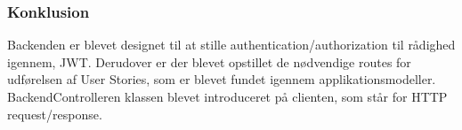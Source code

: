 \subsubsection{Konklusion}

Backenden er blevet designet til at stille authentication/authorization til rådighed igennem, JWT. Derudover er der blevet opstillet de nødvendige routes for udførelsen af User Stories, som er blevet fundet igennem applikationsmodeller. BackendControlleren klassen blevet introduceret på clienten, som står for HTTP request/response.\\ 


\newpage
